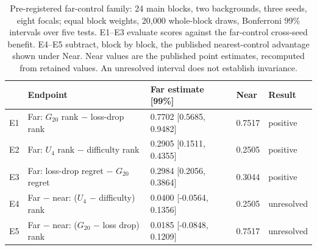 \begin{table}[tp]
\centering
\small
\begin{tabular}{@{}lllll@{}}
\toprule
& Endpoint & Far estimate [99\%] & Near & Result \\
\midrule
E1 & Far: $G_{20}$ rank $-$ loss-drop rank & 0.7702 [0.5685, 0.9482] & 0.7517 & positive \\
E2 & Far: $U_4$ rank $-$ difficulty rank & 0.2905 [0.1511, 0.4355] & 0.2505 & positive \\
E3 & Far: loss-drop regret $-$ $G_{20}$ regret & 0.2984 [0.2056, 0.3864] & 0.3044 & positive \\
E4 & Far $-$ near: ($U_4$ $-$ difficulty) rank & 0.0400 [-0.0564, 0.1356] & 0.2505 & unresolved \\
E5 & Far $-$ near: ($G_{20}$ $-$ loss drop) rank & 0.0185 [-0.0848, 0.1209] & 0.7517 & unresolved \\
\bottomrule
\end{tabular}
\caption{Pre-registered far-control family: 24 main blocks, two backgrounds, three seeds, eight focals; equal block weights, 20,000 whole-block draws, Bonferroni 99\% intervals over five tests. E1--E3 evaluate scores against the far-control cross-seed benefit. E4--E5 subtract, block by block, the published nearest-control advantage shown under Near. Near values are the published point estimates, recomputed from retained values. An unresolved interval does not establish invariance.}
\label{tab:e01_endpoints}
\end{table}
